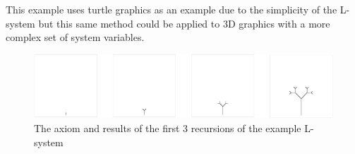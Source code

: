 \documentclass[progress]{cmpreport}
\begin{document}
This example uses turtle graphics as an example due to the simplicity of the L-system but this 
same method could be applied to 3D graphics with a more complex set of system variables.\\

\begin{figure}[h]
        \includegraphics[scale=0.75]{l-system}
        \caption{The axiom and results of the first 3 recursions of the example L-system}
        \centering
\end{figure}

\clearpage

\end{document}

